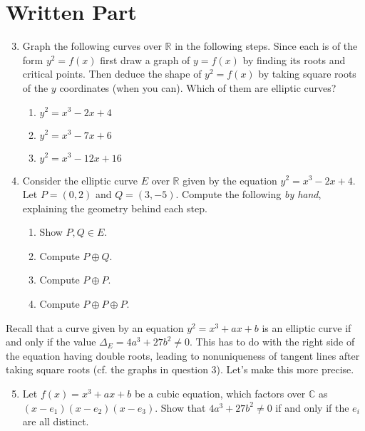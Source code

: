 \documentclass[11pt]{article}
\begin{document}
\section*{Written Part}
\begin{enumerate}
\setcounter{enumi}{2}
  \item{
  Graph the following curves over $\mathbb{R}$ in the following steps. Since each is of the form $y^2=f(x)$ first draw a graph of $y = f(x)$ by finding its roots and critical points.  Then deduce the shape of $y^2 = f(x)$ by taking square roots of the $y$ coordinates (when you can).  Which of them are elliptic curves?
  \begin{enumerate}
  \item $y^2 = x^3 -2x+4$
  \item $y^2 = x^3 - 7x + 6$
  \item $y^2 = x^3 - 12x + 16$
  \end{enumerate}
  }
\item{
Consider the elliptic curve $E$ over $\mathbb{R}$ given by the equation $y^2 = x^3 - 2x + 4$.  Let $P = (0,2)$ and $Q = (3,-5)$.  Compute the following \textit{by hand}, explaining the geometry behind each step. 
  \begin{enumerate}
    \item{
    Show $P,Q\in E$.
    }
    \item{
    Compute $P\oplus Q$.
    }
    \item{
    Compute $P\oplus P$.
    }
    \item{
    Compute $P\oplus P\oplus P$.
    }
  \end{enumerate}
  }
\end{enumerate}
Recall that a curve given by an equation $y^2 = x^3 + ax + b$ is an elliptic curve if and only if the value $\Delta_E = 4a^3 + 27b^2\not=0$.   This has to do with the right side of the equation having double roots, leading to nonuniqueness of tangent lines after taking square roots (cf. the graphs in question 3).  Let's make this more precise.
\begin{enumerate}
\setcounter{enumi}{4}
  \item{
  Let $f(x) = x^3 + ax + b$ be a cubic equation, which factors over $\mathbb{C}$ as $(x-e_1)(x-e_2)(x-e_3)$.  Show that $4a^3 + 27b^2\not= 0$ if and only if the $e_i$ are all distinct.}
  
  \end{enumerate}
\end{document}
